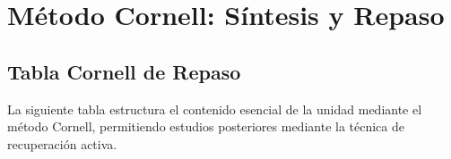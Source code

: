 \documentclass[12pt,oneside]{book}
\begin{document}

\chapter{Método Cornell: Síntesis y Repaso}

\section{Tabla Cornell de Repaso}

La siguiente tabla estructura el contenido esencial de la unidad mediante el método Cornell, permitiendo estudios posteriores mediante la técnica de recuperación activa.
\end{document}
